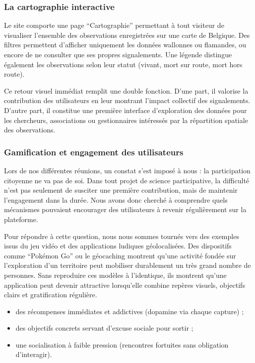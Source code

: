 \documentclass[a4paper,11pt]{article}
\begin{document}
\subsubsection{La cartographie interactive}

Le site comporte une page \enquote{Cartographie} permettant à tout visiteur de visualiser l’ensemble des observations enregistrées sur une carte de Belgique. Des filtres permettent d’afficher uniquement les données wallonnes ou flamandes, ou encore de ne consulter que ses propres signalements. Une légende distingue également les observations selon leur statut (vivant, mort sur route, mort hors route).

Ce retour visuel immédiat remplit une double fonction. D’une part, il valorise la contribution des utilisateurs en leur montrant l’impact collectif des signalements. D’autre part, il constitue une première interface d’exploration des données pour les chercheurs, associations ou gestionnaires intéressés par la répartition spatiale des observations.

\subsubsection{Gamification et engagement des utilisateurs}

Lors de nos différentes réunions, un constat s’est imposé à nous : la participation citoyenne ne va pas de soi. Dans tout projet de science participative, la difficulté n’est pas seulement de susciter une première contribution, mais de maintenir l’engagement dans la durée. Nous avons donc cherché à comprendre quels mécanismes pouvaient encourager des utilisateurs à revenir régulièrement sur la plateforme.

Pour répondre à cette question, nous nous sommes tournés vers des exemples issus du jeu vidéo et des applications ludiques géolocalisées. Des dispositifs comme \enquote{Pokémon Go} ou le géocaching montrent qu’une activité fondée sur l’exploration d’un territoire peut mobiliser durablement un très grand nombre de personnes. Sans reproduire ces modèles à l’identique, ils montrent qu’une application peut devenir attractive lorsqu’elle combine repères visuels, objectifs clairs et gratification régulière.
\begin{itemize}
    \item des récompenses immédiates et addictives (dopamine via chaque capture) ;
    \item des objectifs concrets servant d’excuse sociale pour sortir ;
    \item une socialisation à faible pression (rencontres fortuites sans obligation d’interagir).
\end{itemize}
\end{document}

